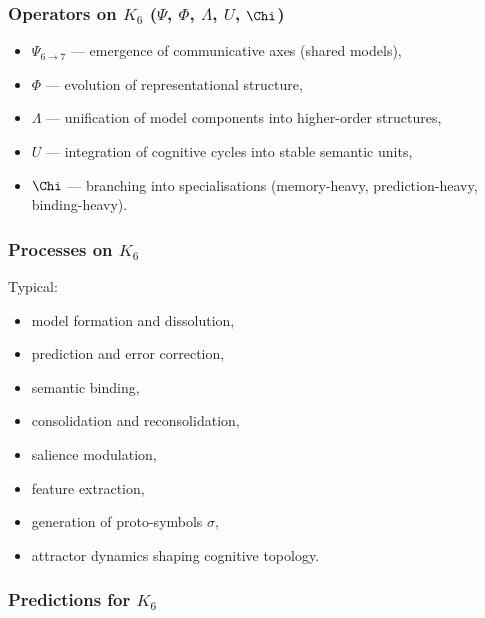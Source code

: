 \subsubsection{Operators on \texorpdfstring{$K_6$}{K_6} (\texorpdfstring{$\Psi$}{\Psi}, \texorpdfstring{$\Phi$}{\Phi}, \texorpdfstring{$\Lambda$}{\Lambda}, \texorpdfstring{$U$}{U}, \texorpdfstring{$\Chi$}{\Chi})}

\begin{itemize}
    \item $\Psi_{6\to7}$ — emergence of communicative axes (shared models),
    \item $\Phi$ — evolution of representational structure,
    \item $\Lambda$ — unification of model components into higher-order structures,
    \item $U$ — integration of cognitive cycles into stable semantic units,
    \item $\Chi$ — branching into specialisations (memory-heavy, prediction-heavy, binding-heavy).
\end{itemize}

\subsubsection{Processes on \texorpdfstring{$K_6$}{K_6}}

Typical:
\begin{itemize}
    \item model formation and dissolution,
    \item prediction and error correction,
    \item semantic binding,
    \item consolidation and reconsolidation,
    \item salience modulation,
    \item feature extraction,
    \item generation of proto-symbols $\sigma$,
    \item attractor dynamics shaping cognitive topology.
\end{itemize}

\subsubsection{Predictions for \texorpdfstring{$K_6$}{K_6}}


